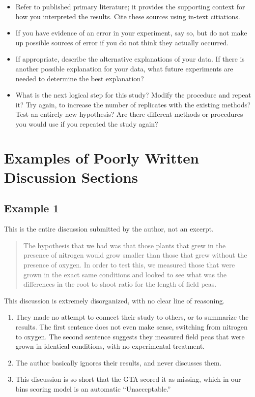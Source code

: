 \documentclass[
]{book}
\providecommand{\tightlist}{%
  \setlength{\itemsep}{0pt}\setlength{\parskip}{0pt}}
\begin{document}
\begin{itemize}
\tightlist
\item
  Refer to published primary literature; it provides the supporting context for how you interpreted the results. Cite these sources using in-text citiations.
\item
  If you have evidence of an error in your experiment, say so, but do not make up possible sources of error if you do not think they actually occurred.
\item
  If appropriate, describe the alternative explanations of your data. If there is another possible explanation for your data, what future experiments are needed to determine the best explanation?
\item
  What is the next logical step for this study? Modify the procedure and repeat it? Try again, to increase the number of replicates with the existing methods? Test an entirely new hypothesis? Are there different methods or procedures you would use if you repeated the study again?
\end{itemize}

\hypertarget{examples-of-poorly-written-discussion-sections}{%
\section{Examples of Poorly Written Discussion Sections}\label{examples-of-poorly-written-discussion-sections}}

\hypertarget{example-1-8}{%
\subsection{Example 1}\label{example-1-8}}

This is the entire discussion submitted by the author, not an excerpt.

\begin{quote}
The hypothesis that we had was that those plants that grew in the presence of nitrogen would grow smaller than those that grew without the presence of oxygen. In order to test this, we measured those that were grown in the exact same conditions and looked to see what was the differences in the root to shoot ratio for the length of field peas.
\end{quote}

This discussion is extremely disorganized, with no clear line of reasoning.

\begin{enumerate}
\def\labelenumi{\arabic{enumi}.}
\tightlist
\item
  They made no attempt to connect their study to others, or to summarize the results. The first sentence does not even make sense, switching from nitrogen to oxygen. The second sentence suggests they measured field peas that were grown in identical conditions, with no experimental treatment.
\item
  The author basically ignores their results, and never discusses them.
\item
  This discussion is so short that the GTA scored it as missing, which in our bins scoring model is an automatic ``Unacceptable.''
\end{enumerate}
\end{document}
